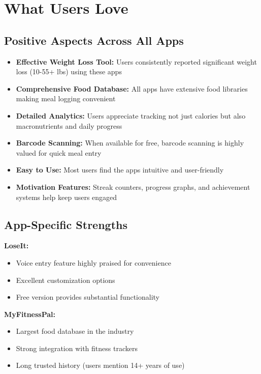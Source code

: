 \documentclass[12pt, a4paper]{article}
\begin{document}
\vspace{0.5cm}

\section{What Users Love}

\subsection{Positive Aspects Across All Apps}

\begin{itemize}
    \item \textbf{Effective Weight Loss Tool:} Users consistently reported significant weight loss (10-55+ lbs) using these apps
    \item \textbf{Comprehensive Food Database:} All apps have extensive food libraries making meal logging convenient
    \item \textbf{Detailed Analytics:} Users appreciate tracking not just calories but also macronutrients and daily progress
    \item \textbf{Barcode Scanning:} When available for free, barcode scanning is highly valued for quick meal entry
    \item \textbf{Easy to Use:} Most users find the apps intuitive and user-friendly
    \item \textbf{Motivation Features:} Streak counters, progress graphs, and achievement systems help keep users engaged
\end{itemize}

\subsection{App-Specific Strengths}

\textbf{LoseIt:}
\begin{itemize}
    \item Voice entry feature highly praised for convenience
    \item Excellent customization options
    \item Free version provides substantial functionality
\end{itemize}

\textbf{MyFitnessPal:}
\begin{itemize}
    \item Largest food database in the industry
    \item Strong integration with fitness trackers
    \item Long trusted history (users mention 14+ years of use)
\end{itemize}
\end{document}
